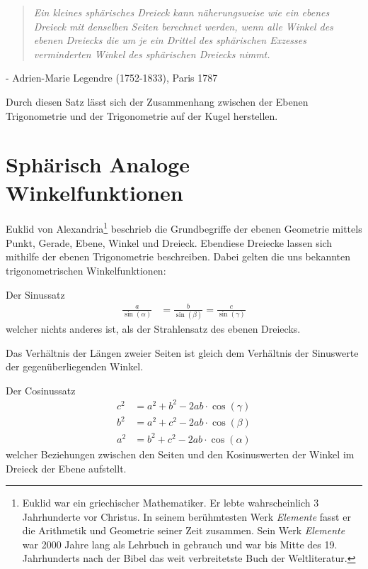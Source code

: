 \begin{refsection}
\begin{quote} \textit{Ein kleines sphärisches Dreieck kann näherungsweise 
wie ein ebenes Dreieck mit denselben Seiten berechnet 
werden, wenn alle Winkel des ebenen Dreiecks die um 
je ein Drittel des sphärischen Exzesses verminderten 
Winkel des sphärischen Dreiecks nimmt.} \end{quote}
\begin{flushright} - Adrien-Marie Legendre (1752-1833), Paris 1787
\end{flushright}

Durch diesen Satz lässt sich der Zusammenhang zwischen der Ebenen Trigonometrie und der Trigonometrie auf der Kugel herstellen.



\section{Sphärisch Analoge Winkelfunktionen}
Euklid von Alexandria\footnote{%
Euklid war ein griechischer Mathematiker. Er lebte wahrscheinlich 3 Jahrhunderte vor Christus. In seinem berühmtesten Werk \textit{Elemente} fasst er die Arithmetik und Geometrie seiner Zeit zusammen. Sein Werk \textit{Elemente} war 2000 Jahre lang als Lehrbuch in gebrauch und war bis Mitte des 19. Jahrhunderts nach der Bibel das weit verbreitetste Buch der Weltliteratur.}  beschrieb die Grundbegriffe der ebenen Geometrie mittels Punkt, Gerade, Ebene, Winkel und Dreieck. Ebendiese Dreiecke lassen sich mithilfe der ebenen Trigonometrie beschreiben. Dabei gelten die uns bekannten trigonometrischen Winkelfunktionen:

Der Sinussatz
\begin{align*}
\frac{ a }{\sin(\alpha) } &= \frac{ b }{\sin(\beta)} = \frac{ c }{\sin(\gamma)}
\end{align*}
welcher nichts anderes ist, als der Strahlensatz des ebenen Dreiecks. 

\begin{definition}
Das Verhältnis der Längen zweier Seiten ist gleich dem Verhältnis der Sinuswerte der gegenüberliegenden Winkel.
\end{definition}

Der Cosinussatz
\begin{align*}
c^{ 2 } &= a^{ 2 } + b^{ 2 } - 2ab\cdot \cos(\gamma)\\
b^{ 2 } &= a^{ 2 } + c^{ 2 } - 2ab\cdot \cos(\beta)\\
a^{ 2 } &= b^{ 2 } + c^{ 2 } - 2ab\cdot \cos(\alpha)
\end{align*}
welcher Beziehungen zwischen den Seiten und den Kosinuswerten der Winkel im Dreieck der Ebene aufstellt.


\end{refsection}
